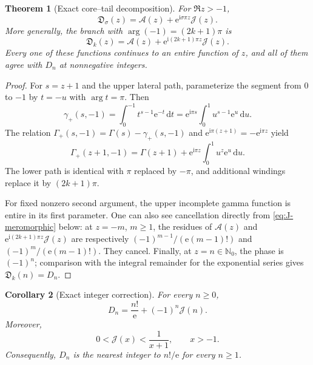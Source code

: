 \documentclass[11pt,a4paper]{article}
\numberwithin{equation}{section}
\newtheorem{theorem}{Theorem}[section]
\newtheorem{corollary}[theorem]{Corollary}
\theoremstyle{definition}
\theoremstyle{remark}
\newcommand{\e}{\mathrm e}
\newcommand{\ii}{\mathrm i}
\newcommand{\dd}{\,\mathrm d}
\newcommand{\Sub}{\mathfrak D}
\newcommand{\Core}{\mathcal A}
\newcommand{\Tail}{\mathcal J}
\begin{document}
\begin{theorem}[Exact core--tail decomposition]\label{thm:core-tail}
For $\Re z>-1$,
\begin{equation}\label{eq:core-tail}
 \boxed{\quad
 \Sub_{\sigma}(z)=\Core(z)+\e^{\ii\sigma\pi z}\Tail(z).
 \quad}
\end{equation}
More generally, the branch with $\arg(-1)=(2k+1)\pi$ is
\begin{equation}\label{eq:winding-branch}
 \Sub_k(z)=\Core(z)+\e^{\ii(2k+1)\pi z}\Tail(z).
\end{equation}
Every one of these functions continues to an entire function of $z$, and
all of them agree with $D_n$ at nonnegative integers.
\end{theorem}

\begin{proof}
For $s=z+1$ and the upper lateral path, parameterize the segment from $0$
to $-1$ by $t=-u$ with $\arg t=\pi$.  Then
\[
 \gamma_+(s,-1)=\int_0^{-1}t^{s-1}\e^{-t}\dd t
 =\e^{\ii\pi s}\int_0^1u^{s-1}\e^u\dd u.
\]
The relation $\Gamma_+(s,-1)=\Gamma(s)-\gamma_+(s,-1)$ and
$\e^{\ii\pi(z+1)}=-\e^{\ii\pi z}$ yield
\[
 \Gamma_+(z+1,-1)=\Gamma(z+1)
 +\e^{\ii\pi z}\int_0^1u^z\e^u\dd u.
\]
The lower path is identical with $\pi$ replaced by $-\pi$, and additional
windings replace it by $(2k+1)\pi$.

For fixed nonzero second argument, the upper incomplete gamma function is
entire in its first parameter.  One can also see cancellation directly from
\eqref{eq:J-meromorphic} below: at $z=-m$, $m\ge1$, the residues of
$\Core(z)$ and $\e^{\ii(2k+1)\pi z}\Tail(z)$ are respectively
$(-1)^{m-1}/(\e(m-1)!)$ and $(-1)^m/(\e(m-1)!)$.  They cancel.  Finally,
at $z=n\in\mathbb N_0$, the phase is $(-1)^n$; comparison with the integral
remainder for the exponential series gives $\Sub_k(n)=D_n$.
\end{proof}

\begin{corollary}[Exact integer correction]\label{cor:integer-correction}
For every $n\ge0$,
\begin{equation}\label{eq:integer-correction}
 D_n=\frac{n!}{\e}+(-1)^n\Tail(n).
\end{equation}
Moreover,
\begin{equation}\label{eq:J-simple-bound}
 0<\Tail(x)<\frac1{x+1},\qquad x>-1.
\end{equation}
Consequently, $D_n$ is the nearest integer to $n!/\e$ for every $n\ge1$.
\end{corollary}
\end{document}
